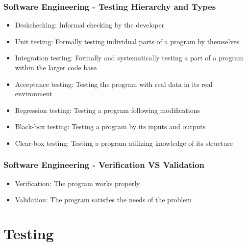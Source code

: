 \documentclass[c, aspectratio=169]{beamer}
\begin{document}
\begin{frame}\frametitle{Software Engineering - Testing Hierarchy and Types}
\begin{itemize}
\item Deskchecking: Informal checking by the developer
\item Unit testing: Formally testing individual parts of a program by themselves
\item Integration testing: Formally and systematically testing a part of a program within the larger code base
\item Acceptance testing: Testing the program with real data in its real environment
\item Regression testing: Testing a program following modifications
\item Black-box testing: Testing a program by its inputs and outputs
\item Clear-box testing: Testing a program utilizing knowledge of its structure
\end{itemize}
\end{frame}

\begin{frame}\frametitle{Software Engineering - Verification VS Validation}
\begin{itemize}
\item Verification: The program works properly
\item Validation: The program satisfies the needs of the problem
\end{itemize}
\end{frame}

\section{Testing}
\end{document}
